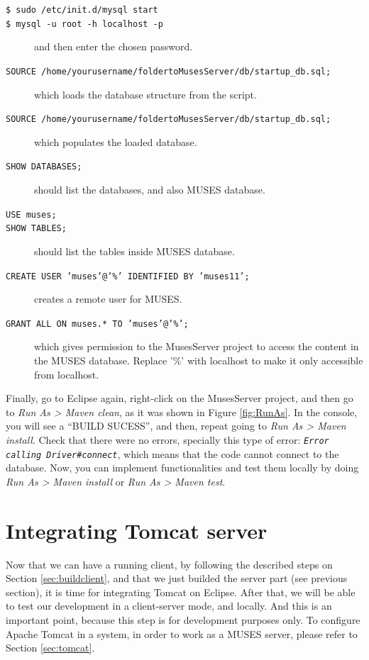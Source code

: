 \begin{description}
  \item[\texttt{\$ sudo /etc/init.d/mysql start}] 
  \item[\texttt{\$ mysql -u root -h localhost -p}] and then enter the chosen password.
  \item[\texttt{SOURCE /home/yourusername/foldertoMusesServer/db/startup\_db.sql;}] which loads the database structure from the script.
  \item[\texttt{SOURCE /home/yourusername/foldertoMusesServer/db/startup\_db.sql;}] which populates the loaded database.
  \item[\texttt{SHOW DATABASES;}] should list the databases, and also MUSES database.
  \item[\texttt{USE muses;}]
  \item[\texttt{SHOW TABLES;}] should list the tables inside MUSES database.
  \item[\texttt{CREATE USER 'muses'@'\%' IDENTIFIED BY 'muses11';}] creates a remote user for MUSES.
  \item[\texttt{GRANT ALL ON muses.* TO 'muses'@'\%';}] which gives permission to the MusesServer project to access the content in the MUSES database. Replace '\%' with localhost to make it only accessible from localhost.
\end{description}

Finally, go to Eclipse again, right-click on the MusesServer project, and then go to \textit{Run As > Maven clean}, as it was shown in Figure \ref{fig:RunAs}. In the console, you will see a ``BUILD SUCESS'', and then, repeat going to \textit{Run As > Maven install}. Check that there were no errors, specially this type of error: \texttt{\textit{Error calling Driver\#connect}}, which means that the code cannot connect to the database. Now, you can implement functionalities and test them locally by doing \textit{Run As > Maven install} or \textit{Run As > Maven test}.

\section{Integrating Tomcat server}
\label{sec:eclipsetomcat}

Now that we can have a running client, by following the described steps on Section \ref{sec:buildclient}, and that we just builded the server part (see previous section), it is time for integrating Tomcat on Eclipse. After that, we will be able to test our development in a client-server mode, and locally. And this is an important point, because this step is for development purposes only. To configure Apache Tomcat in a system, in order to work as a MUSES server, please refer to Section \ref{sec:tomcat}.

